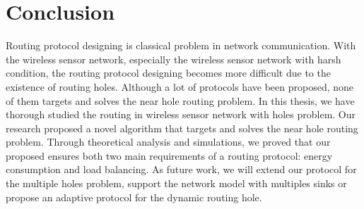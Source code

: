 \chapter{Conclusion}\label{chapter8}
Routing protocol designing is classical problem in network communication. With the wireless sensor network, especially the wireless sensor network with harsh condition, the routing protocol designing becomes more difficult due to the existence of routing holes. Although a lot of protocols have been proposed, none of them targets and solves the near hole routing problem. In this thesis, we have thorough studied the routing in wireless sensor network with holes problem. Our research proposed a novel algorithm that targets and solves the near hole routing problem. Through theoretical analysis and simulations, we proved that our proposed ensures both two main requirements of a routing protocol: energy consumption and load balancing. As future work, we will extend our protocol for the multiple holes problem, support the network model with multiples sinks or propose an adaptive protocol for the dynamic routing hole.